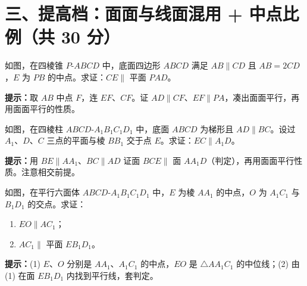 \documentclass{exam-zh}
\begin{document}
\clearpage
\section*{三、提高档：面面与线面混用 + 中点比例（共 30 分）}


\begin{problem}[points=10]
    如图，在四棱锥 $P$-$ABCD$ 中，底面四边形 $ABCD$ 满足 $AB\parallel CD$ 且 $AB=2CD$，$E$ 为 $PB$ 的中点。求证：$CE\parallel$ 平面 $PAD$。

    \begin{hintbox}
\textbf{提示：}取 $AB$ 中点 $F$，连 $EF$、$CF$。证 $AD\parallel CF$、$EF\parallel PA$，凑出面面平行，再用面面平行的性质。\end{hintbox}

  \answerarea[75mm]
\end{problem}



\begin{problem}[points=10]
    如图，在四棱柱 $ABCD$-$A_{1}B_{1}C_{1}D_{1}$ 中，底面 $ABCD$ 为梯形且 $AD\parallel BC$。设过 $A_{1}$、$D$、$C$ 三点的平面与棱 $BB_{1}$ 交于点 $E$。求证：$EC\parallel A_{1}D$。

    \begin{hintbox}
\textbf{提示：}用 $BE\parallel AA_{1}$、$BC\parallel AD$ 证面 $BCE\parallel$ 面 $AA_{1}D$（判定），再用面面平行性质。注意相交前提。\end{hintbox}

  \answerarea[75mm]
\end{problem}



\begin{problem}[points=10]
    如图，在平行六面体 $ABCD$-$A_{1}B_{1}C_{1}D_{1}$ 中，$E$ 为棱 $AA_{1}$ 的中点，$O$ 为 $A_{1}C_{1}$ 与 $B_{1}D_{1}$ 的交点。求证：
\begin{enumerate}[label=(\arabic*)]
  \item $EO\parallel AC_{1}$；
  \item $AC_{1}\parallel$ 平面 $EB_{1}D_{1}$。
\end{enumerate}

    \begin{hintbox}
\textbf{提示：}(1) $E$、$O$ 分别是 $AA_{1}$、$A_{1}C_{1}$ 的中点，$EO$ 是 $\triangle AA_{1}C_{1}$ 的中位线；(2) 由 (1) 在面 $EB_{1}D_{1}$ 内找到平行线，套判定。\end{hintbox}

  \answerarea[70mm]
\end{problem}
\end{document}

